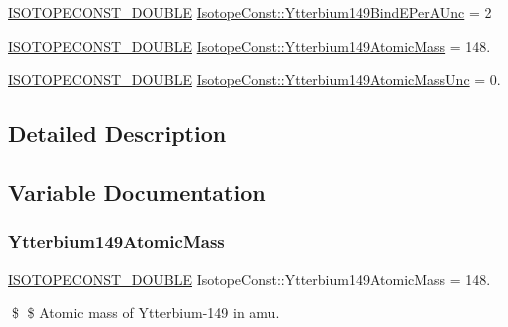 \begin{DoxyCompactItemize}
\mbox{\hyperlink{group___isotope_const-_macros_ga8f45a7272ce02c0b4c65c44636ed719a}{I\+S\+O\+T\+O\+P\+E\+C\+O\+N\+S\+T\+\_\+\+D\+O\+U\+B\+LE}} \mbox{\hyperlink{group___isotope_const-_ytterbium-_yb149_gac7e7e6abb3329cff31038c62f136f63a}{Isotope\+Const\+::\+Ytterbium149\+Bind\+E\+Per\+A\+Unc}} = 2
\item 
\mbox{\hyperlink{group___isotope_const-_macros_ga8f45a7272ce02c0b4c65c44636ed719a}{I\+S\+O\+T\+O\+P\+E\+C\+O\+N\+S\+T\+\_\+\+D\+O\+U\+B\+LE}} \mbox{\hyperlink{group___isotope_const-_ytterbium-_yb149_ga750226cb3587e61ef7da053d86b2ff89}{Isotope\+Const\+::\+Ytterbium149\+Atomic\+Mass}} = 148.
\item 
\mbox{\hyperlink{group___isotope_const-_macros_ga8f45a7272ce02c0b4c65c44636ed719a}{I\+S\+O\+T\+O\+P\+E\+C\+O\+N\+S\+T\+\_\+\+D\+O\+U\+B\+LE}} \mbox{\hyperlink{group___isotope_const-_ytterbium-_yb149_ga8b277452d00d4ed450dbbaa1076616b4}{Isotope\+Const\+::\+Ytterbium149\+Atomic\+Mass\+Unc}} = 0.
\end{DoxyCompactItemize}


\subsection{Detailed Description}


\subsection{Variable Documentation}
\mbox{\label{group___isotope_const-_ytterbium-_yb149_ga750226cb3587e61ef7da053d86b2ff89}} 
\subsubsection{\texorpdfstring{Ytterbium149\+Atomic\+Mass}{Ytterbium149AtomicMass}}
{\footnotesize\ttfamily \mbox{\hyperlink{group___isotope_const-_macros_ga8f45a7272ce02c0b4c65c44636ed719a}{I\+S\+O\+T\+O\+P\+E\+C\+O\+N\+S\+T\+\_\+\+D\+O\+U\+B\+LE}} Isotope\+Const\+::\+Ytterbium149\+Atomic\+Mass = 148.}

\$ \$ Atomic mass of Ytterbium-\/149 in amu. \mbox{\label{group___isotope_const-_ytterbium-_yb149_ga8b277452d00d4ed450dbbaa1076616b4}} 
